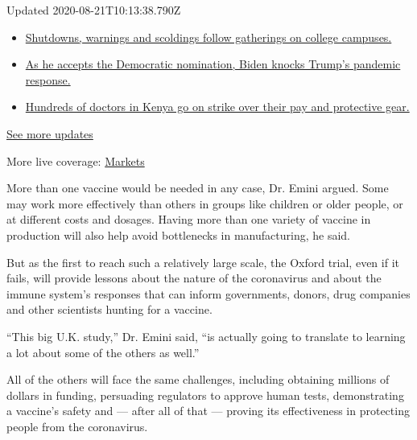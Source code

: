 Updated 2020-08-21T10:13:38.790Z

\begin{itemize}
\tightlist
\item
  \href{https://www.nytimes3xbfgragh.onion/2020/08/21/world/covid-19-coronavirus.html?action=click\&pgtype=Article\&state=default\&region=MAIN_CONTENT_1\&context=storylines_live_updates\#link-4690b6aa}{Shutdowns,
  warnings and scoldings follow gatherings on college campuses.}
\item
  \href{https://www.nytimes3xbfgragh.onion/2020/08/21/world/covid-19-coronavirus.html?action=click\&pgtype=Article\&state=default\&region=MAIN_CONTENT_1\&context=storylines_live_updates\#link-324af071}{As
  he accepts the Democratic nomination, Biden knocks Trump's pandemic
  response.}
\item
  \href{https://www.nytimes3xbfgragh.onion/2020/08/21/world/covid-19-coronavirus.html?action=click\&pgtype=Article\&state=default\&region=MAIN_CONTENT_1\&context=storylines_live_updates\#link-35890b73}{Hundreds
  of doctors in Kenya go on strike over their pay and protective gear.}
\end{itemize}

\href{https://www.nytimes3xbfgragh.onion/2020/08/21/world/covid-19-coronavirus.html?action=click\&pgtype=Article\&state=default\&region=MAIN_CONTENT_1\&context=storylines_live_updates}{See
more updates}

More live coverage:
\href{https://www.nytimes3xbfgragh.onion/live/2020/08/20/business/stock-market-today-coronavirus?action=click\&pgtype=Article\&state=default\&region=MAIN_CONTENT_1\&context=storylines_live_updates}{Markets}

More than one vaccine would be needed in any case, Dr. Emini argued.
Some may work more effectively than others in groups like children or
older people, or at different costs and dosages. Having more than one
variety of vaccine in production will also help avoid bottlenecks in
manufacturing, he said.

But as the first to reach such a relatively large scale, the Oxford
trial, even if it fails, will provide lessons about the nature of the
coronavirus and about the immune system's responses that can inform
governments, donors, drug companies and other scientists hunting for a
vaccine.

``This big U.K. study,'' Dr. Emini said, ``is actually going to
translate to learning a lot about some of the others as well.''

All of the others will face the same challenges, including obtaining
millions of dollars in funding, persuading regulators to approve human
tests, demonstrating a vaccine's safety and --- after all of that ---
proving its effectiveness in protecting people from the coronavirus.

